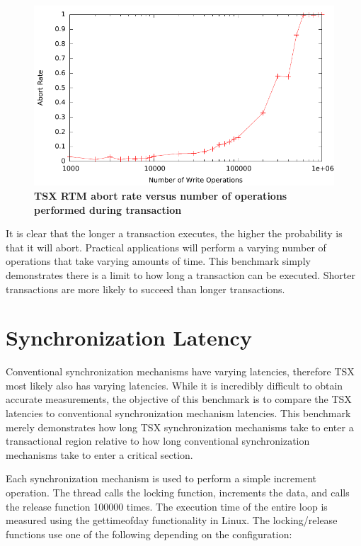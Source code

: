 \documentclass[11pt]{book}
\begin{document}
\begin{figure}[H]
    \centering
    \graphicspath{ {./figures/} }
    \includegraphics[width=\textwidth,height=\textheight,keepaspectratio]{trxDuration}
    \caption{\textbf{TSX RTM abort rate versus number of operations performed
    during transaction}}
    \label{fig:trx_duration}
\end{figure}

It is clear that the longer a transaction executes, the higher the probability
is that it will abort.  Practical applications will perform a varying number of
operations that take varying amounts of time.  This benchmark simply
demonstrates there is a limit to how long a transaction can be executed.
Shorter transactions are more likely to succeed than longer transactions.

\section{Synchronization Latency}

Conventional synchronization mechanisms have varying latencies, therefore TSX most likely
also has varying latencies.  While it is incredibly difficult to obtain accurate
measurements, the objective of this benchmark is to compare the TSX latencies to conventional
synchronization mechanism latencies.  This benchmark merely demonstrates how
long TSX synchronization mechanisms take to enter a transactional region relative to how
long conventional synchronization mechanisms take to enter a critical section.

Each synchronization mechanism is used to perform a simple increment operation.
The thread calls the locking function, increments the data, and calls the release
function 100000 times.  The execution time of the entire loop is
measured using the gettimeofday functionality in Linux.  The locking/release
functions use one of the following depending on the configuration: 
\end{document}
